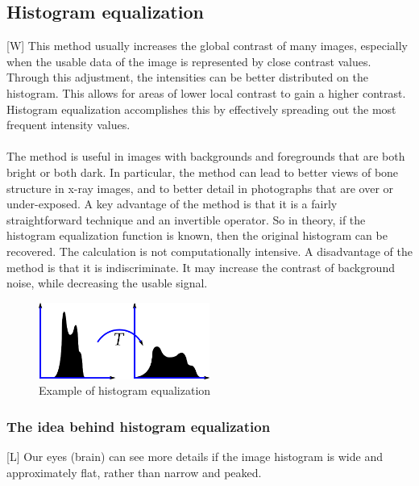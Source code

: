 \documentclass[12pt]{article}
\begin{document}
	\subsection{Histogram equalization}
	[W] This method usually increases the global contrast of many images, especially when the usable data
	 of the image is represented by close contrast values. Through this adjustment, the intensities 
	 can be better distributed on the histogram. This allows for areas of lower local contrast to gain 
	 a higher contrast. Histogram equalization accomplishes this by effectively spreading out the most 
	 frequent intensity values.\\
	 \\
	The method is useful in images with backgrounds and foregrounds that are both bright or both dark. 
	In particular, the method can lead to better views of bone structure in x-ray images, and to 
	better detail in photographs that are over or under-exposed. A key advantage of the method is that 
	it is a fairly straightforward technique and an invertible operator. So in theory, if the 
	histogram equalization function is known, then the original histogram can be recovered. The 
	calculation is not computationally intensive. A disadvantage of the method is that it is 
	indiscriminate. It may increase the contrast of background noise, while decreasing the usable 
	signal.
	\begin{figure}[h!]
		\centering
		\includegraphics[width=0.5\textwidth]{img/histogram_equalization.png}
		\caption{Example of histogram equalization}		
		\label{fig:histeq}
	\end{figure}
	\subsubsection{The idea behind histogram equalization}
	[L] Our eyes (brain) can see more details if the image histogram is wide and approximately
	flat, rather than narrow and peaked.
	
\end{document}
